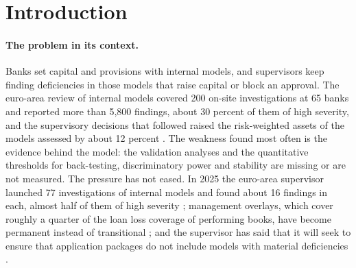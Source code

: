 \section{Introduction}
\label{sec:introduction}

\paragraph{The problem in its context.} Banks set capital and provisions with internal models, and supervisors keep finding deficiencies
in those models that raise capital or block an approval. The euro-area review of internal models covered 200 on-site investigations at 65
banks and reported more than 5,800 findings, about 30 percent of them of high severity, and the supervisory decisions that followed raised the
risk-weighted assets of the models assessed by about 12 percent \citep{fr:ecbtrim}. The weakness found most often is the evidence behind the
model: the validation analyses and the quantitative thresholds for back-testing, discriminatory power and stability are missing or are not
measured. The pressure has not eased. In 2025 the euro-area supervisor launched 77 investigations of internal models and found about 16
findings in each, almost half of them of high severity \citep{fr:ecbar2025}; management overlays, which cover roughly a quarter of the loan loss
coverage of performing books, have become permanent instead of transitional \citep{fr:ecboverlays}; and the supervisor has said that it will seek
to ensure that application packages do not include models with material deficiencies \citep{fr:ecbnl2025}.

